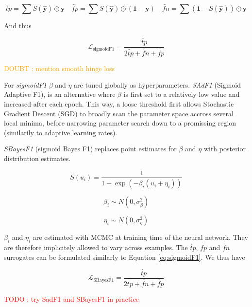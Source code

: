 \documentclass[sigconf,natbib,screen=true,review=true,anonymous]{acmart}
\newcommand\todo[1]{\textcolor{red}{TODO : #1}}
\newcommand\doubt[1]{\textcolor{orange}{DOUBT : #1}}
\begin{document}
\begin{equation}\label{eq:sigmoidF1}
\widetilde{tp}=\sum S(\hat{\mathbf{y}}) \odot \mathbf{y} \quad\widetilde{fp}= \sum S(\hat{\mathbf{y}}) \odot (\mathbf{1} - \mathbf{y}) \quad \widetilde{f n}= \sum (\mathbf{1} - S(\hat{\mathbf{y}})) \odot \mathbf{y}
\end{equation}

And thus

\begin{equation}
\mathcal{L}_{\text {sigmoidF1}}= \frac{\widetilde{tp}}{2 \widetilde{tp}+ \widetilde{fn}+ \widetilde{fp}}
\end{equation}

\doubt{mention smooth hinge loss} \cite{smoothHinge}

For \emph{sigmoidF1} \(\beta\) and \(\eta\) are tuned globally as hyperparameters. \emph{SAdF1} (Sigmoid Adaptive F1), is an alternative where \(\beta\) is first set to a relatively low value and increased after each epoch. This way, a loose threshold first allows Stochastic Gradient Descent (SGD) to broadly scan the parameter space accross several local minima, before narrowing parameter search down to a promissing region (similarily to adaptive learning rates).

\emph{SBayesF1} (sigmoid Bayes F1) replaces point estimates for \(\beta\) and \(\eta\) with posterior distribution estimates. 

\begin{equation}
\dot{S}(u_i) = \frac{1}{1+\exp (-\beta_i (u_i + \eta_i))}
\end{equation}

$$ \beta_i \sim N(0, \sigma^{2}_{\beta}) $$

$$ \eta_i \sim N(0, \sigma^{2}_{\eta}) $$

\(\beta_i\) and \(\eta_i\) are estimated with MCMC at training time of the neural network. They are therefore implicitely allowed to vary across examples. The \(\dot{tp}\), \(\dot{fp}\) and \(\dot{fn}\) surrogates can be formulated similarly to Equation \ref{eq:sigmoidF1}. We thus have

\begin{equation}
\mathcal{L}_{\text {SBayesF1}}= \frac{\dot{tp}}{2 \dot{tp}+ \dot{fn}+ \dot{fp}}
\end{equation}



\todo{try SadF1 and SBayesF1 in practice}
\end{document}
